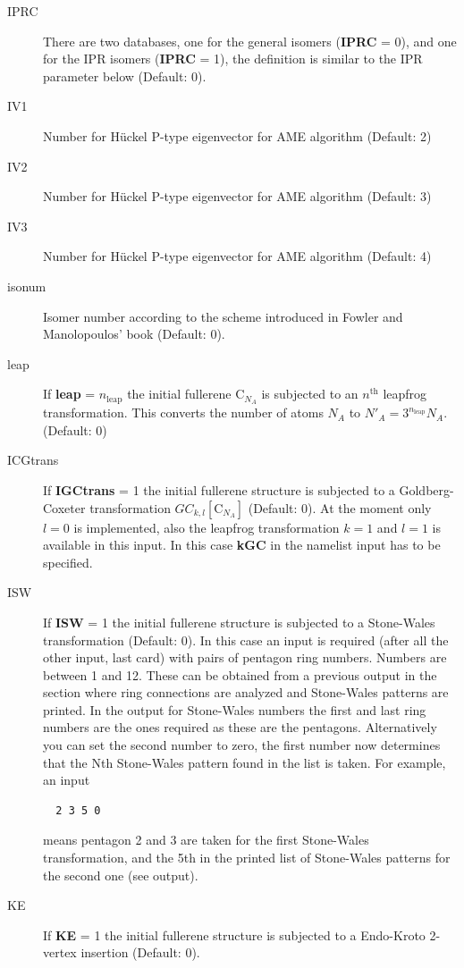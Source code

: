 \documentclass[article,a4paper,twoside]{memoir}
\newcommand{\C}[1]{\ensuremath{\mathrm{C}_{#1}}}
\newcommand{\paramname}[1]{{\color{green}\textbf{#1}}}
\begin{document}
\begin{description}
\item[{IPRC}]
There are two databases, one for the general isomers
(\paramname{IPRC} = 0), and one for the IPR isomers (\paramname{IPRC} = 1), the definition is similar to the IPR parameter below (Default: 0).
\item[{IV1}] Number for H\"uckel P-type eigenvector for AME algorithm (Default: 2)
\item[{IV2}] Number for H\"uckel P-type eigenvector for AME algorithm (Default: 3)
\item[{IV3}] Number for H\"uckel P-type eigenvector for AME algorithm (Default: 4)
\item[{isonum}] Isomer number according to the scheme introduced in Fowler and Manolopoulos' book \cite{Atlas} (Default: 0).
\item[{leap}] If \paramname{leap} = $n_\mathrm{leap}$ the initial fullerene C$_{N_A}$ is subjected to an $n^\mathrm{th}$ leapfrog transformation. 
This converts the number of atoms $N_A$ to $N'_A = 3^{n_\mathrm{leap}}N_A$. (Default: 0)
\item[{ICGtrans}] 
If \paramname{IGCtrans} = 1 the initial fullerene structure is subjected to a Goldberg-Coxeter transformation $GC_{k,l}[\C{N_A}]$ (Default: 0).
At the moment only $l=0$ is implemented, also the leapfrog transformation $k=1$ and $l=1$ is available in this input.
In this case \paramname{kGC} in the namelist input has to be specified. 
\item[ISW] 
  If \paramname{ISW} = 1 the initial fullerene structure is subjected
  to a Stone-Wales transformation (Default: 0). In this case an input
  is required (after all the other input, last card) with pairs of
  pentagon ring numbers. Numbers are between 1 and 12. These can be
  obtained from a previous output in the section where ring
  connections are analyzed and Stone-Wales patterns are printed. In
  the output for Stone-Wales numbers the first and last ring numbers
  are the ones required as these are the pentagons. Alternatively you
  can set the second number to zero, the first number now determines
  that the Nth Stone-Wales pattern found in the list is taken.  For
  example, an input
\begin{verbatim}
  2 3 5 0
\end{verbatim}
means pentagon 2 and 3 are taken for the first Stone-Wales transformation, and the 5th in the printed list of 
Stone-Wales patterns for the second one (see output).
\item[KE] 
If \paramname{KE} = 1 the initial fullerene structure is subjected to a Endo-Kroto 2-vertex insertion (Default: 0).

\end{description}
\end{document}
